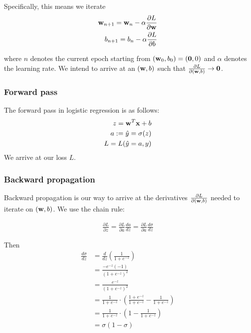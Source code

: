 \documentclass[a4paper]{article}
\begin{document}
Specifically, this means we iterate
\begin{align}
\bold w_{n+1} = \bold w_n - \alpha \frac{\partial L}{\partial \bold w} \\
b_{n+1} = b_n - \alpha \frac{\partial L}{\partial b}
\end{align}

where $n$ denotes the current epoch starting from $(\bold w_0, b_0) = (\bold 0, 0)$ and $\alpha$ denotes the learning rate. We intend to arrive at an $(\bold w, b)$ such that $\frac{\partial L}{\partial (\bold w,b)} \rightarrow \bold 0$.

\subsubsection{Forward pass}

The forward pass in logistic regression is as follows:
\begin{align}
z = \bold w ^T \bold x + b \\
a:=\hat y = \sigma(z) \\
L = L(\hat y=a, y)
\end{align}
We arrive at our loss $L$.

\subsubsection{Backward propagation}

Backward propagation is our way to arrive at the derivatives $\frac{\partial L}{\partial (\bold w,b)}$ needed to iterate on $(\bold w,b)$. We use the chain rule:

\begin{align}
\frac{\partial L}{\partial z} = \frac{\partial L}{\partial a} \frac{da}{dz} = \frac{\partial L}{\partial a} \frac{d\sigma}{dz}
\end{align}

Then
\begin{align}
\frac{d\sigma}{dz} &= \frac{d}{dz} \left( \frac{1}{1 + e^{-z}} \right) \\
 &= \frac{-e^{-z}(-1)}{(1 + e^{-z})^2} \\
 &= \frac{e^{-z}}{(1 + e^{-z})^2} \\
 &= \frac{1}{1 + e^{-z}} \cdot \left(\frac{1 + e^{-z}}{1 + e^{-z}} - \frac{1}{1 + e^{-z}}\right) \\
 &= \frac{1}{1 + e^{-z}} \cdot \left(1 - \frac{1}{1 + e^{-z}}\right) \\
 &= \sigma (1 - \sigma) 
\end{align}
\end{document}
